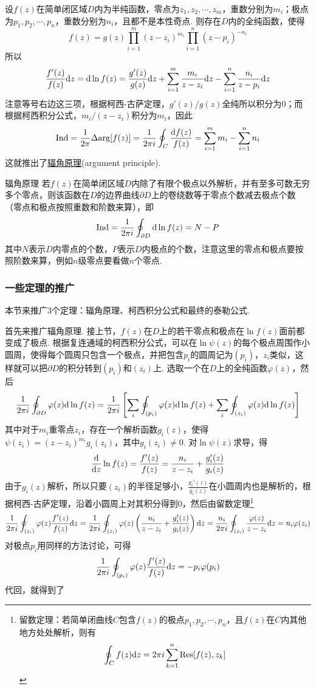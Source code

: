 设\(f(z)\)在简单闭区域\(D\)内为半纯函数，零点为\(z_1,z_2,\cdots,z_m\)，重数分别为\(m_i\)；极点为\(p_1, p_2, \cdots, p_n\)，重数分别为\(n_i\)，且都不是本性奇点. 则存在\(D\)内的全纯函数，使得
\[f(z) = g(z)\prod_{i=1}^{m}(z-z_i)^{m_i}\prod_{i=1}^{n}(z-p_i)^{-n_i}\]
所以
\[\frac{f'(z)}{f(z)}{\rm d}z = {\rm d}\ln f(z) = \frac{g'(z)}{g(z)}{\rm d}z + \sum_{i=1}^{m}\frac{m_i}{z-z_i}{\rm d}z - \sum_{i=1}^{n} \frac{n_i}{z-p_i} {\rm d}z\]
注意等号右边这三项，根据柯西-古萨定理，\(g'(z)/g(z)\)全纯所以积分为\(0\)；而根据柯西积分公式，\(m_i/(z-z_i)\)积分为\(m_i\)，因此
\[{\rm Ind} = \frac{1}{2\pi}\Delta{\rm arg} [f(z)] = \frac{1}{2\pi i}\oint_{C}\frac{{\rm d}f(z)}{f(z)} = \sum_{i=1}^{m}m_i - \sum_{i=1}^{n}n_i\]
这就推出了\uline{辐角原理}(argument principle).

\begin{theorem}{辐角原理}
    若\(f(z)\)在简单闭区域\(D\)内除了有限个极点以外解析，并有至多可数无穷多个零点，则该函数在\(D\)的边界曲线\(\partial D\)上的卷绕数等于零点个数减去极点个数（零点和极点按照重数和阶数来算），即
    \[{\rm Ind} = \frac{1}{2\pi i}\oint_{\partial D}{\rm d}\ln f(z) = N-P\]
    其中\(N\)表示\(D\)内零点的个数，\(P\)表示\(D\)内极点的个数，注意这里的零点和极点要按照阶数来算，例如\(n\)级零点要看做\(n\)个零点.
\end{theorem}

\subsubsection{一些定理的推广}

本节来推广3个定理：辐角原理、柯西积分公式和最终的泰勒公式.

首先来推广辐角原理. 接上节，\(f(z)\)在\(D\)上的若干零点和极点在\(\ln f(z)\)面前都变成了极点. 根据复连通域的柯西积分公式，可以在\(\ln\psi(z)\)的每个极点周围作小圆周，使得每个圆周只包含一个极点，并把包含\(p_i\)的圆周记为\((p_i)\)，\(z_i\)类似，这样就可以把\(\partial D\)的积分转到\((p_i)\)和\((z_i)\)上. 选取一个在\(D\)上的全纯函数\(\varphi(z)\)，然后
\[\frac{1}{2\pi i}\oint_{\partial D}\varphi(z){\rm d}\ln f(z) = \frac{1}{2\pi i}\left[\sum_{i}\oint_{(p_i)}\varphi(z){\rm d}\ln f(z)+\sum_{i}\oint_{(z_i)}\varphi(z){\rm d}\ln f(z)\right]\]
其中对于\(m_i\)重零点\(z_i\)，存在一个解析函数\(g_i(z)\)，使得\(\psi(z_i) = (z-z_i)^{m_i}g_i(z_i)\)，其中\(g_i(z_i)\neq 0\). 对\(\ln\psi(z)\)求导，得
\[\frac{{\rm d}}{{\rm d}z}\ln f(z) = \frac{f'(z)}{f(z)} = \frac{n_i}{z-z_i}+\frac{g_i'(z)}{g_i(z)}\]
由于\(g_i(z)\)解析，所以只要\((z_i)\)的半径足够小，\(\frac{g_i'(z)}{g_i(z)}\)在小圆周内也是解析的，根据柯西-古萨定理，沿着小圆周上对其积分得到\(0\)，然后由留数定理\footnote{留数定理：若简单闭曲线\(C\)包含\(f(z)\)的极点\(p_1, p_2, \cdots, p_n\)，且\(f(z)\)在\(C\)内其他地方处处解析，则有
\[\oint_C f(z){\rm d}z = 2\pi i\sum_{k=1}^{n}{\rm Res}[f(z),z_k]\]}
\[\frac{1}{2\pi i}\oint_{(z_i)}\varphi(z)\frac{f'(z)}{f(z)}{\rm d}z = \frac{1}{2\pi i}\oint_{(z_i)}\varphi(z)\left(\frac{n_i}{z-z_i}+\frac{g_i'(z)}{g_i(z)}\right){\rm d}z = \frac{n_i}{2\pi i}\oint_{(z_i)}\frac{\varphi(z)}{z-z_i}{\rm d}z = n_i\varphi(z_i)\]
对极点\(p_i\)用同样的方法讨论，可得
\[\frac{1}{2 \pi i}\oint_{(p_i)}\varphi(z)\frac{f'(z)}{f(z)}{\rm d}z = -p_i\varphi(p_i)\]
代回，就得到了

